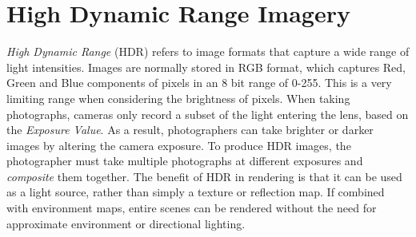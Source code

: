 \documentclass[ %
                    author={Gavin Parker},
                supervisor={Dr. Neill Campbell},
                    degree={MEng},
                     title={Deep Learning for Illumination Estimation from Stereo Images},
                  subtitle={},
                      type={Research},
                      year={2018} ]{dissertation}
\begin{document}
\section{High Dynamic Range Imagery}
\textit{High Dynamic Range} (HDR) refers to image formats that capture a wide range of light intensities. Images are normally stored in RGB format, which captures Red, Green and Blue components of pixels in an 8 bit range of 0-255. This is a very limiting range when considering the brightness of pixels. When taking photographs, cameras only record a subset of the light entering the lens, based on the \textit{Exposure Value}. As a result, photographers can take brighter or darker images by altering the camera exposure. To produce HDR images, the photographer must take multiple photographs at different exposures and \textit{composite} them together. The benefit of HDR in rendering is that it can be used as a light source, rather than simply a texture or reflection map. If combined with environment maps, entire scenes can be rendered without the need for approximate environment or directional lighting.
\end{document}
